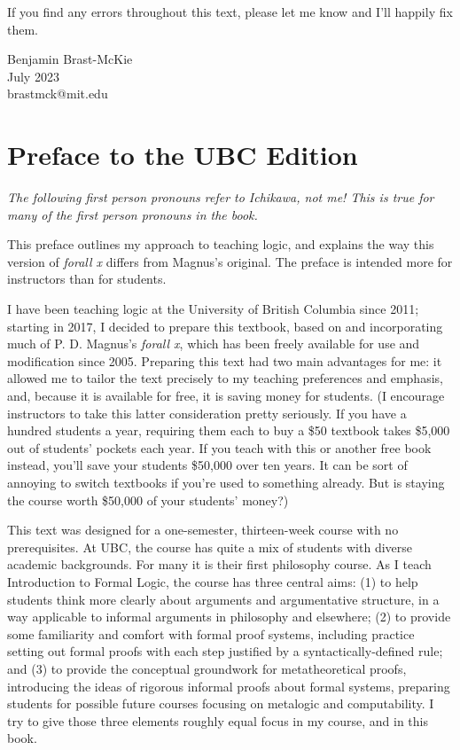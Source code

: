 If you find any errors throughout this text, please let me know and I'll happily fix them.

\begin{flushright}
Benjamin Brast-McKie \\
July 2023 \\
brastmck@mit.edu
\end{flushright}


\chapter*{Preface to the UBC Edition}
\label{ch.preface}

\textit{The following first person pronouns refer to Ichikawa, not me! This is true for many of the first person pronouns in the book.}

This preface outlines my approach to teaching logic, and explains the way this version of \emph{forall x} differs from Magnus's original. The preface is intended more for instructors than for students. 

I have been teaching logic at the University of British Columbia since 2011; starting in 2017, I decided to prepare this textbook, based on and incorporating much of P. D. Magnus's \emph{forall x}, which has been freely available for use and modification since 2005. Preparing this text had two main advantages for me: it allowed me to tailor the text precisely to my teaching preferences and emphasis, and, because it is available for free, it is saving money for students. (I encourage instructors to take this latter consideration pretty seriously. If you have a hundred students a year, requiring them each to buy a \$50 textbook takes \$5,000 out of students' pockets each year. If you teach with this or another free book instead, you'll save your students \$50,000 over ten years. It can be sort of annoying to switch textbooks if you're used to something already. But is staying the course worth \$50,000 of your students' money?)

This text was designed for a one-semester, thirteen-week course with no prerequisites. At UBC, the course has quite a mix of students with diverse academic backgrounds. For many it is their first philosophy course. As I teach Introduction to Formal Logic, the course has three central aims: (1) to help students think more clearly about arguments and argumentative structure, in a way applicable to informal arguments in philosophy and elsewhere; (2) to provide some familiarity and comfort with formal proof systems, including practice setting out formal proofs with each step justified by a syntactically-defined rule; and (3) to provide the conceptual groundwork for metatheoretical proofs, introducing the ideas of rigorous informal proofs about formal systems, preparing students for possible future courses focusing on metalogic and computability. I try to give those three elements roughly equal focus in my course, and in this book.

